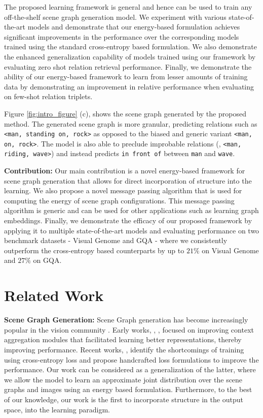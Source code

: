 \documentclass[final]{cvpr}
\begin{document}
The proposed learning framework is general and hence can be used to train any off-the-shelf scene graph generation model. We experiment with various state-of-the-art models and demonstrate that our energy-based formulation achieves significant improvements in the performance over the corresponding models trained using the standard cross-entropy based formulation. We also demonstrate the enhanced generalization capability of models trained using our framework by evaluating zero shot relation retrieval performance. Finally, we demonstrate the ability of our energy-based framework to learn from lesser amounts of training data by demonstrating an improvement in relative performance when evaluating on few-shot relation triplets. 

Figure \ref{fig:intro_figure} (c), shows the scene graph generated by the proposed method. The generated scene graph is more granular, predicting relations such as \texttt{<man, standing on, rock>} as opposed to the biased and generic variant \texttt{<man, on, rock>}. The model is also able to preclude improbable relations (\eg, \texttt{<man, riding, wave>}) and instead predicts \texttt{in front of} between \texttt{man} and \texttt{wave}.

\vspace{0.06in}
\noindent
\textbf{Contribution:} Our main contribution is a novel energy-based framework for scene graph generation that allows for direct incorporation of structure into the learning. We also propose a novel message passing algorithm that is used for computing the energy of scene graph configurations. This message passing algorithm is generic and can be used for other applications such as learning graph embeddings. Finally, we demonstrate the efficacy of our proposed framework by applying it to multiple state-of-the-art models and evaluating performance on 
two benchmark datasets - Visual Genome \cite{krishna2017visual} and GQA \cite{hudson2018gqa} - where we consistently outperform the cross-entropy based counterparts by up to $21\%$ on Visual Genome and $27\%$ on GQA.

\section{Related Work}
\noindent
\textbf{Scene Graph Generation:}
Scene Graph generation has become increasingly popular in the vision community  \cite{knyazev2020graph, li2018fnet, Lin_2020_CVPR, newell2017pixels, tang2020unbiased, xu2017scene, yang2018graph, ZareianKC20, ZareianWYC20, zellers2018neural}. Early works, \eg,  \cite{xu2017scene, yang2018graph, zellers2018neural}, focused on improving context aggregation modules that facilitated learning better representations, thereby improving performance. Recent works, \cite{knyazev2020graph, Lin_2020_CVPR, zhang2019graphical}, identify the shortcomings of training using cross-entropy loss and propose handcrafted loss formulations to improve the performance. Our work can be considered as a generalization of the latter, where we allow the model to learn an approximate joint distribution over the scene graphs and images using an energy based formulation. Furthermore, to the best of our knowledge, our work is the first to incorporate structure in the output space, into the learning paradigm.
\end{document}
